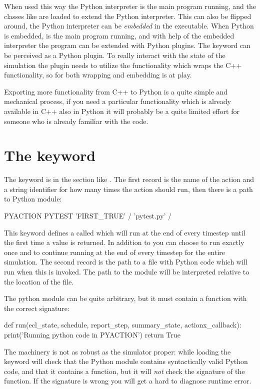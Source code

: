When used this way the Python interpreter is the main program running, and the
\flow{} classes like  are loaded to extend the Python
interpreter. This can also be flipped around, the Python interpreter can be
\emph{embedded} in the \flow{} executable. When Python is embedded, \flow{} is
the main program running, and with help of the embedded interpreter the \flow{}
program can be extended with Python plugins. The \pyaction{} keyword can be
perceived as a Python plugin. To really interact with the state of the \flow{}
simulation the plugin needs to utilize the functionality which wraps the C++
functionality, so for \pyaction{} both wrapping and embedding is at play.

Exporting more functionality from C++ to Python is a quite simple and mechanical
process, if you need a particular functionality which is already available in
C++ also in Python it will probably be a quite limited effort for someone who is
already familiar with the code.


\section{The \pyaction{} keyword}
The \pyaction{} keyword is in the  section like \actionx{}. The
first record is the name of the action and a string identifier for how many
times the action should run, then there is a path to Python module:

\begin{deck}
PYACTION
  PYTEST 'FIRST_TRUE' /
  'pytest.py' /
\end{deck}

This keyword defines a \pyaction{} called  which will run at the end
of every timestep until the first time a  value is returned. In
addition to  you can choose  to run exactly once and
 to continue running at the end of every timestep for the entire
simulation. The second record is the path to a file with Python code which will
run when this \pyaction{} is invoked. The path to the module will be interpreted
relative to the location of the  file.

The python module can be quite arbitrary, but it must contain a function
 with the correct signature:
\begin{code}
def run(ecl_state, schedule, report_step, summary_state, actionx_callback):
    print('Running python code in PYACTION')
    return True
\end{code}
The \pyaction{} machinery is not as robust as the simulator proper: while
loading the  keyword \flow{} will check that the Python module
contains syntactically valid Python code, and that it contains a
 function, but it will \emph{not} check the signature of the
 function. If the signature is wrong you will get a hard to
diagnose runtime error.

